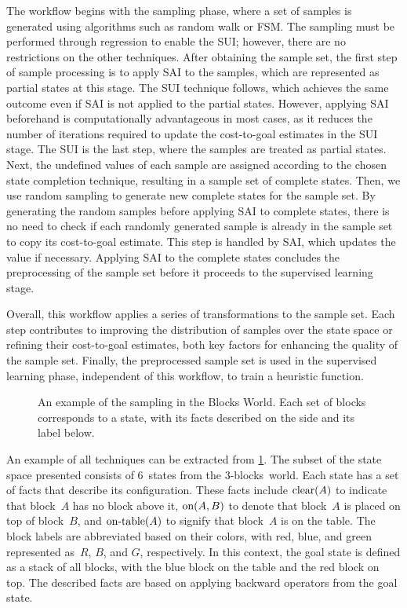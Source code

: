 The workflow begins with the sampling phase, where a set of samples is generated using algorithms such as random walk or FSM. The sampling must be performed through regression to enable the SUI; however, there are no restrictions on the other techniques.
After obtaining the sample set, the first step of sample processing is to apply SAI to the samples, which are represented as partial states at this stage. The SUI technique follows, which achieves the same outcome even if SAI is not applied to the partial states. However, applying SAI beforehand is computationally advantageous in most cases, as it reduces the number of iterations required to update the cost-to-goal estimates in the SUI stage.
The SUI is the last step, where the samples are treated as partial states. Next, the undefined values of each sample are assigned according to the chosen state completion technique, resulting in a sample set of complete states.
Then, we use random sampling to generate new complete states for the sample set. By generating the random samples before applying SAI to complete states, there is no need to check if each randomly generated sample is already in the sample set to copy its cost-to-goal estimate. This step is handled by SAI, which updates the value if necessary. Applying SAI to the complete states concludes the preprocessing of the sample set before it proceeds to the supervised learning stage.

Overall, this workflow applies a series of transformations to the sample set. Each step contributes to improving the distribution of samples over the state space or refining their cost-to-goal estimates, both key factors for enhancing the quality of the sample set. Finally, the preprocessed sample set is used in the supervised learning phase, independent of this workflow, to train a heuristic function.

\begin{figure}[tb]
    \caption[An example of the sampling in the Blocks World.]{An example of the sampling in the Blocks World. Each set of blocks corresponds to a state, with its facts described on the side and its label below.}
    \label{fig:example}
    \addmargin
    \centering
    
\end{figure}

An example of all techniques can be extracted from \cref{fig:example}. The subset of the state space presented consists of $6$~states from the $3$-blocks~world. Each state has a set of facts that describe its configuration. These facts include $\text{clear}(A)$ to indicate that block~$A$ has no block above it, $\text{on}(A,B)$ to denote that block~$A$ is placed on top of block~$B$, and $\text{on-table}(A)$ to signify that block~$A$ is on the table. The block labels are abbreviated based on their colors, with red, blue, and green represented as~$R$, $B$, and $G$, respectively. In this context, the goal state is defined as a stack of all blocks, with the blue block on the table and the red block on top. The described facts are based on applying backward operators from the goal state.

